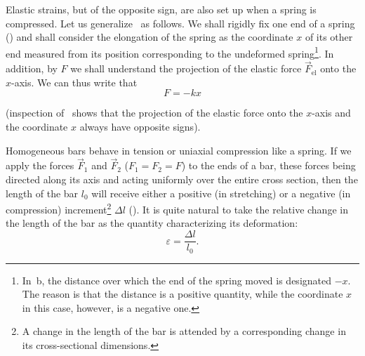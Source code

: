 Elastic strains, but of the opposite sign, are also set up when a spring is compressed. Let us generalize~ as follows. We shall rigidly fix one end of a spring () and shall consider the elongation of the spring as the coordinate $x$ of its other end measured from its position corresponding to the undeformed spring\footnote{In~b, the distance over which the end of the spring moved is designated $-x$. The reason is that the distance is a positive quantity, while the		coordinate $x$ in this case, however, is a negative one.}. In addition, by $F$ we shall understand the projection of the elastic force $\vec{F}_{\text{el}}$ onto the $x$-axis. We can thus write that
\begin{equation}\label{eq:2_26}
F = -k x
\end{equation}

(inspection of~ shows that the projection of the elastic force onto the $x$-axis and the coordinate $x$ always have opposite signs).


Homogeneous bars behave in tension or uniaxial compression like a spring. If we apply the forces $\vec{F}_1$ and $\vec{F}_2$ ($F_1=F_2=F$) to the ends of a bar, these forces being directed along its axis and acting uniformly over the entire cross section, then the length of the bar $l_0$ will receive either a positive (in stretching) or a negative (in compression) increment\footnote{A change in the length of the bar is attended by a corresponding change in its cross-sectional dimensions.} $\Delta l$ (). It is quite natural to take the relative change in the length of the bar as the quantity characterizing its deformation:
\begin{equation}\label{eq:2_27}
\varepsilon = \frac{\Delta l}{l_0}.
\end{equation}


